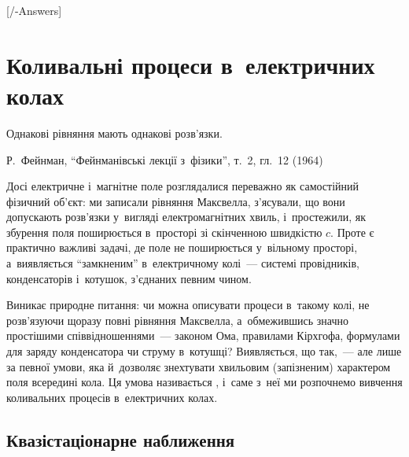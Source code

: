 
[\currfilebase/\currfilebase-Answers]
\chapter{Коливальні процеси в~електричних колах}\label{\currfilebase}\hypertarget{EMOscillations}{}
\graphicspath{{\currfilebase/Pictures}}
\epigraph{\Alexander Однакові рівняння мають однакові розв'язки.}{Р.~Фейнман, \enquote{Фейнманівські
лекції з~фізики}, т.~2, гл.~12 (1964)}


Досі електричне і~магнітне поле розглядалися переважно як самостійний фізичний об'єкт: ми записали рівняння Максвелла, з'ясували, що вони допускають
розв'язки у~вигляді електромагнітних хвиль, і~простежили, як збурення поля поширюється в~просторі зі скінченною швидкістю $c$. Проте є практично важливі задачі, де поле не поширюється у~вільному просторі, а~виявляється \enquote{замкненим} в~електричному колі~--- системі провідників,
конденсаторів і~котушок, з'єднаних певним чином.

Виникає природне питання: чи можна описувати процеси в~такому колі, не розв'язуючи щоразу повні рівняння Максвелла, а~обмежившись значно простішими
співвідношеннями~--- законом Ома, правилами Кірхгофа, формулами для заряду конденсатора чи струму в~котушці? Виявляється, що так,~--- але лише за певної
умови, яка й~дозволяє знехтувати хвильовим (запізненим) характером поля всередині кола. Ця умова називається , і~саме
з~неї ми розпочнемо вивчення коливальних процесів в~електричних колах.

\section{Квазістаціонарне наближення}\label{sec:quasi-stationary-approximation}\hypertarget{quasi-stationary-approximation}{}

